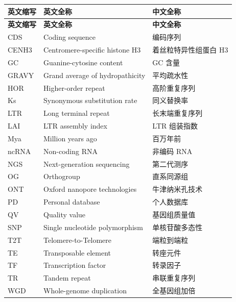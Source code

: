 \cleardoublepage
{}
\begin{center}
    \begin{longtable}{m{3cm}m{7cm}m{5cm}}
        \toprule
        \textbf{英文缩写}&\textbf{英文全称}&\textbf{中文全称}\\
        \midrule
        \endfirsthead
        \toprule
        \textbf{英文缩写}&\textbf{英文全称}&\textbf{中文全称}\\
        \midrule
        \endhead 
        \bottomrule
        \endfoot
        \bottomrule
        \endlastfoot
        CDS&Coding sequence&编码序列\\
        CENH3&Centromere-specific histone H3&着丝粒特异性组蛋白 H3\\
        GC&Guanine-cytosine content&GC 含量\\
        GRAVY&Grand average of hydropathicity&平均疏水性\\
        HOR&Higher-order repeat&高阶重复序列\\
        Ks&Synonymous substitution rate&同义替换率\\
        LTR&Long terminal repeat&长末端重复序列\\
        LAI&LTR assembly index&LTR 组装指数\\
        Mya&Million years ago&百万年前\\
        ncRNA&Non-coding RNA&非编码 RNA\\
        NGS&Next-generation sequencing&第二代测序\\
        OG&Orthogroup&直系同源组\\
        ONT&Oxford nanopore technologies&牛津纳米孔技术\\
        PD&Personal database&个人数据库\\
        QV&Quality value&基因组质量值\\
        SNP&Single nucleotide polymorphism&单核苷酸多态性\\
        T2T&Telomere-to-Telomere&端粒到端粒\\
        TE&Transposable element&转座元件\\
        TF&Transcription factor&转录因子\\
        TR&Tandem repeat&串联重复序列\\
        WGD&Whole-genome duplication&全基因组加倍\\
    \end{longtable}
\end{center}